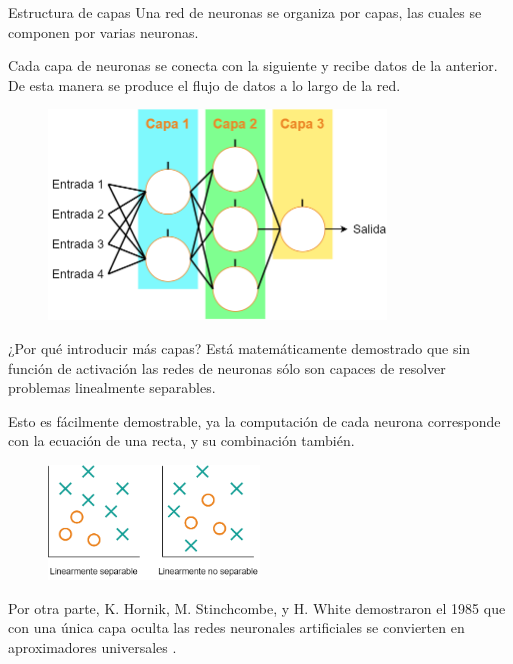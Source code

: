 \begin{frame}{Estructura de capas}
Una red de neuronas  se organiza por \alert{capas}, las cuales se componen por varias \alert{neuronas}.

Cada \alert{capa de neuronas} se conecta con la siguiente y recibe \alert{datos} de la anterior. De esta manera se produce el \alert{flujo de datos} a lo largo de la red.

\begin{figure}
\centering
    \includegraphics[width=0.8\textwidth]{figures/Tema 3/LayerStructure.png}
\end{figure}
\end{frame}

\begin{frame}{¿Por qué introducir más capas?}
Está matemáticamente \alert{demostrado} que sin función de activación las redes de neuronas sólo son capaces de resolver problemas \alert{linealmente separables}.

Esto es fácilmente demostrable, ya la computación de cada neurona corresponde con la ecuación de \alert{una recta}, y su combinación también.

\begin{figure}
\centering
    \includegraphics[width=0.5\textwidth]{figures/Tema 1/Separabilidad_Lineal.png}
\end{figure}

Por otra parte, K. Hornik, M. Stinchcombe, y H. White demostraron el 1985 que con \alert{una única capa oculta} las redes neuronales artificiales se convierten en aproximadores universales \cite{hornik1989multilayer}.
\end{frame}


